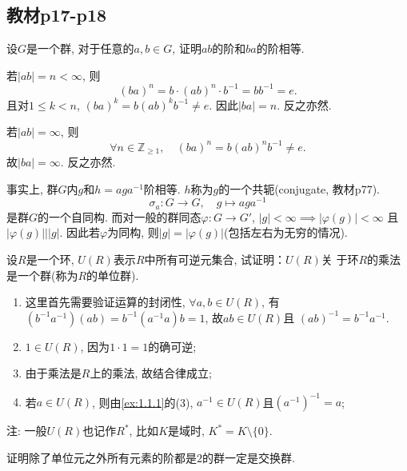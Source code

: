 \subsection{教材p17-p18}

\begin{problem}\label{ex:1.3.1}
    设$G$是一个群, 对于任意的$a, b \in G$, 证明$ab$的阶和$ba$的阶相等.
\end{problem}

\begin{solution}
    若$|ab| = n < \infty$, 则
\[
    (ba)^n = b \cdot (ab)^n \cdot b^{-1} = bb^{-1} = e.
\] 
    且对$1 \leqslant k < n$, $(ba)^k = b(ab)^kb^{-1} \neq e$.
因此$|ba| = n$. 反之亦然.
    
    若$|ab| = \infty$, 则
\[
    \forall n \in \mathbb{Z}_{\geqslant 1}, \quad (ba)^n = b(ab)^nb^{-1} \neq e.
\]
    故$|ba| = \infty$. 反之亦然.

    事实上, 群$G$内$g$和$h = aga^{-1}$阶相等. $h$称为$g$的一个共轭(conjugate, 教材p77).
\[
    \sigma_a: G \to G, \quad g \mapsto aga^{-1}
\]
是群$G$的一个自同构. 而对一般的群同态$\varphi: G \to G'$, $|g| < \infty \implies |\varphi(g)| < \infty$
且$|\varphi(g)| \Big| |g|$. 因此若$\varphi$为同构, 则$|g| = |\varphi(g)|$(包括左右为无穷的情况).
\end{solution}

\begin{problem}\label{ex:1.3.2}
    设$R$是一个环, $U(R)$表示$R$中所有可逆元集合, 试证明：$U(R)$关
于环$R$的乘法是一个群(称为$R$的单位群).
\end{problem}

\begin{solution}
    \begin{enumerate}[(1)]
        \item 这里首先需要验证运算的封闭性, $\forall a, b \in U(R)$, 有
    $(b^{-1}a^{-1})(ab) = b^{-1}(a^{-1}a)b = 1$, 故$ab \in U(R)$且
    $(ab)^{-1} = b^{-1}a^{-1}$.
        \item $1 \in U(R)$, 因为$1 \cdot 1 = 1$的确可逆;
        \item 由于乘法是$R$上的乘法, 故结合律成立;
        \item 若$a \in U(R)$, 则由\ref{ex:1.1.1}的(3), $a^{-1} \in U(R)$且$(a^{-1})^{-1} = a$;
    \end{enumerate}
注: 一般$U(R)$也记作$R^*$, 比如$K$是域时, $K^* = K \setminus \{0\}$.
\end{solution}

\begin{problem}
    证明除了单位元之外所有元素的阶都是$2$的群一定是交换群.
\end{problem}

